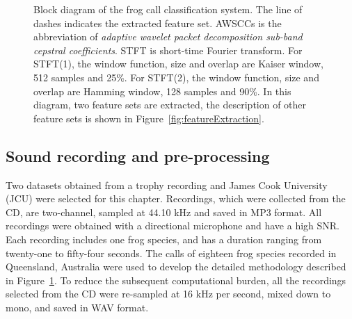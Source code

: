 \begin{figure}[htb!] %
\caption[Block diagram of the frog call classification system for wavelet-based feature extraction]{Block diagram of the frog call classification system. The line of dashes indicates the extracted feature set. AWSCCs is the abbreviation of \textit{adaptive wavelet packet decomposition sub-band cepstral coefficients}. STFT is short-time Fourier transform. For STFT(1), the window function, size and overlap are Kaiser window, 512 samples and 25\%. For STFT(2), the window function, size and overlap are Hamming window, 128 samples and 90\%. In this diagram, two feature sets are extracted, the description of other feature sets is shown in Figure~\ref{fig:featureExtraction}.}
\label{fig:Ch5_flowchart} 
\end{figure}


\subsection{Sound recording and pre-processing}

Two datasets obtained from a trophy recording \citep{CD} and James Cook University (JCU) were selected for this chapter. 
Recordings, which were collected from the CD, are two-channel, sampled at 44.10 kHz and saved in MP3 format. All recordings were obtained with a directional microphone and have a high SNR. Each recording includes one frog species, and has a duration ranging from twenty-one to fifty-four seconds. The calls of eighteen frog species recorded in Queensland, Australia were used to develop the detailed methodology described in Figure~\ref{fig:Ch5_flowchart}. To reduce the subsequent computational burden, all the recordings selected from the CD were re-sampled at 16 kHz per second, mixed down to mono, and saved in WAV format. 

